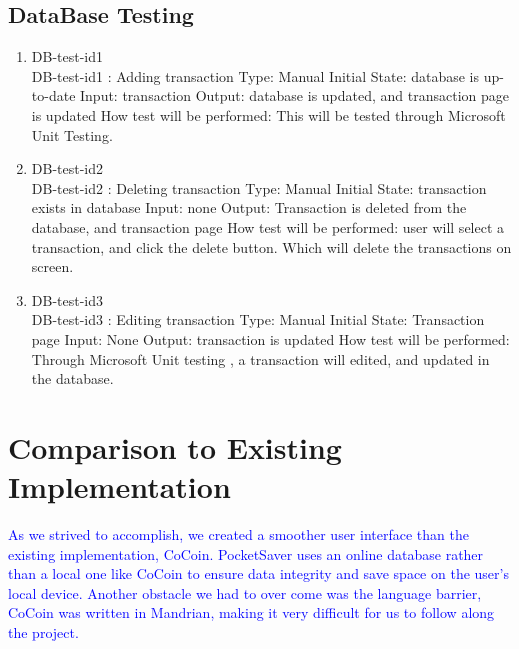 \documentclass[12pt, titlepage]{article}
\begin{document}
\subsection{DataBase Testing}

\begin{enumerate}

\item{DB-test-id1\\}
DB-test-id1 : Adding transaction
\newline
Type: Manual
\newline
Initial State: database is up-to-date 
\newline
Input: transaction 
\newline
Output: database is updated, and transaction page is updated
\newline
How test will be performed:  This will be tested through Microsoft Unit Testing.


					
\item{DB-test-id2\\}
DB-test-id2 : Deleting transaction
\newline
Type: Manual
\newline
Initial State: transaction exists in database
\newline
Input: none
\newline
Output: Transaction is deleted from the database, and transaction page 
\newline
How test will be performed:  user will select a transaction, and click the delete button. Which will delete the transactions on screen.

\item{DB-test-id3\\}
DB-test-id3 : Editing transaction 
\newline
Type: Manual
\newline
Initial State: Transaction page
\newline
Input: None
\newline
Output: transaction is updated 
\newline
How test will be performed:  Through Microsoft Unit testing , a transaction will edited, and updated in the database.
\end{enumerate}


\section{Comparison to Existing Implementation}	
\textcolor{blue}{As we strived to accomplish, we created a smoother user interface than the existing implementation, CoCoin. PocketSaver uses an online database rather than a local one like CoCoin to ensure data integrity and save space on the user's local device. Another obstacle we had to over come was the language barrier, CoCoin was written in Mandrian, making it very difficult for us to follow along the project.}
\end{document}
